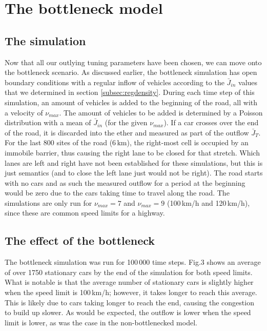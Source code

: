 \documentclass[11pt]{article}
\begin{document}
	\newpage
	
	\section{The bottleneck model}\label{sec:regbottle}
	
	\subsection{The simulation}\label{subsec:bottlesim}
	
	Now that all our outlying tuning parameters have been chosen, we can move onto the bottleneck scenario. As discussed earlier, the bottleneck simulation has open boundary conditions with a regular inflow of vehicles according to the $\bar{J}_{in}$ values that we determined in section \ref{subsec:regdensity}. During each time step of this simulation, an amount of vehicles is added to the beginning of the road, all with a velocity of $\nu_{max}$. The amount of vehicles to be added is determined by a Poisson distribution with a mean of $\bar{J}_{in}$ (for the given $\nu_{max}$). If a car crosses over the end of the road, it is discarded into the ether and measured as part of the outflow $\bar{J}_T$. For the last 800 sites of the road (6\,km), the right-most cell is occupied by an immobile barrier, thus causing the right lane to be closed for that stretch. Which lanes are left and right have not been established for these simulations, but this is just semantics (and to close the left lane just would not be right). The road starts with no cars and as such the measured outflow for a period at the beginning would be zero due to the cars taking time to travel along the road. The simulations are only run for $\nu_{max}=7$ and $\nu_{max}=9$ (100\,km/h and 120\,km/h), since these are common speed limits for a highway.\\
	
	\subsection{The effect of the bottleneck}\label{subsec:effbot}
	
	The bottleneck simulation was run for 100\,000 time steps. Fig.3 shows an average of over 1750 stationary cars by the end of the simulation for both speed limits. What is notable is that the average number of stationary cars is slightly higher when the speed limit is 100\,km/h; however, it takes longer to reach this average. This is likely due to cars taking longer to reach the end, causing the congestion to build up slower. As would be expected, the outflow is lower when the speed limit is lower, as was the case in the non-bottlenecked model.\\
	
\end{document}
